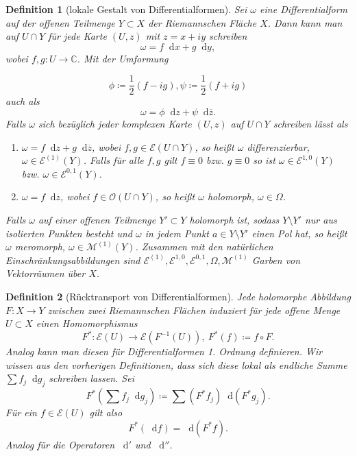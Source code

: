 \documentclass[11pt,a4paper]{scrartcl}
\theoremstyle{thm}
\theoremstyle{def}
\newtheorem{defi}{Definition}[section]
\theoremstyle{remark}
\newcommand*\dif{\mathop{}\!\mathrm{d}}
\begin{document}
\begin{defi}[lokale Gestalt von Differentialformen]
Sei $\omega $ eine Differentialform auf der offenen Teilmenge $Y\subset X$ der Riemannschen Fläche $X$. Dann kann man auf $U\cap Y$ für jede Karte $(U,z)$ mit $z=x+iy$ schreiben
\[
\omega = f\dif x+g\dif y,
\]
wobei $f,g:U\rightarrow \mathbb{C}$. Mit der Umformung

	\[
\phi \coloneqq \frac{1}{2}\left(f-ig\right), \psi \coloneqq \frac{1}{2}\left(f+ig\right)
\]  
auch als
\[
\omega = \phi\dif z+\psi\dif\overline{z}.
\]
Falls $\omega $ sich bezüglich jeder komplexen Karte $(U,z)$ auf $U\cap Y$ schreiben lässt als
\begin{enumerate}
	\item $\omega = f\dif z+g\dif \overline{z}$, wobei $f,g\in \mathcal{E}(U\cap Y)$, so heißt $\omega$ \emph{differenzierbar}, $\omega\in \mathcal{E}^{(1)}(Y)$. Falls für alle $f,g$ gilt $f\equiv 0$ bzw. $g\equiv 0$ so ist $\omega \in \mathcal{E}^{1,0}(Y)$ bzw. $\omega \in \mathcal{E}^{0,1}(Y)$.
	\item $\omega = f\dif z$, wobei $f\in\mathcal{O}(U\cap Y)$, so heißt $\omega$ \emph{holomorph},
	$\omega\in \Omega$.
\end{enumerate}
Falls $\omega$ auf einer offenen Teilmenge $Y'\subset Y$ holomorph ist, sodass $Y\setminus Y'$ nur aus isolierten Punkten besteht und $\omega$ in jedem Punkt $a\in Y\setminus Y'$ einen Pol hat, so heißt $\omega$ \emph{meromorph}, $\omega \in \mathcal{M}^{(1)}(Y)$.
Zusammen mit den natürlichen Einschränkungsabbildungen sind $\mathcal{E}^{(1)},\mathcal{E}^{1,0},\mathcal{E}^{0,1},\Omega,\mathcal{M}^{(1)} $ Garben von Vektorräumen über $X$.
\end{defi}

 \begin{defi}[Rücktransport von Differentialformen]
 	Jede holomorphe Abbildung $F:X\rightarrow Y$ zwischen zwei Riemannschen Flächen induziert für jede offene Menge $U\subset X$ einen Homomorphismus
 	\[
 	F^*:\mathcal{E}(U)\rightarrow \mathcal{E}(F^{-1}(U)),~F^*(f)\coloneqq f\circ F.
 	\]
 	Analog kann man diesen für Differentialformen 1. Ordnung definieren. Wir wissen aus den vorherigen Definitionen, dass sich diese lokal als endliche Summe $\sum f_j\dif g_j$ schreiben lassen. Sei
 	\[
 	F^*(\sum f_j\dif g_j)\coloneqq \sum (F^*f_j)\dif(F^*g_j).
 	\]
 	Für ein $f\in\mathcal{E}(U)$ gilt also
 	\[
 	F^*(\dif f) = \dif (F^*f).
 	\]
 	Analog für die Operatoren $\dif'$ und $\dif''$.
 \end{defi}
\end{document}
